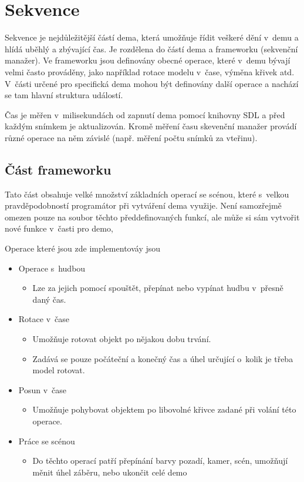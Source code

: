 \chapter{Sekvence} \label{sekvence}
Sekvence je nejdůležitější částí dema, která umožňuje řídit veškeré dění v~demu a hlídá uběhlý a zbývající čas.
Je rozdělena do částí dema a frameworku (sekvenční manažer).
Ve frameworku jsou definovány obecné operace, které v~demu bývají velmi často prováděny, jako například rotace modelu v~čase, výměna křivek atd. 
V~části určené pro specifická dema mohou být definovány další operace a nachází se tam hlavní struktura událostí.

Čas je měřen v~milisekundách od zapnutí dema pomocí knihovny SDL a před každým snímkem je aktualizován.
Kromě měření času skevenční manažer provádí různé operace na něm závislé (např. měření počtu snímků za vteřinu).

\section{Část frameworku}
Tato část obsahuje velké množství základních operací se scénou, které s~velkou pravděpodobností programátor při vytváření dema využije.
Není samozřejmě omezen pouze na soubor těchto předdefinovaných funkcí, ale může si sám vytvořit nové funkce v~časti pro demo,

Operace které jsou zde implementováy jsou 
\begin{itemize}
  \item Operace s~hudbou
    \begin{itemize}
     \item Lze za jejich pomocí spouštět, přepínat nebo vypínat hudbu v~přesně daný čas.
    \end{itemize}
  \item Rotace v~čase
    \begin{itemize}
     \item Umožňuje rotovat objekt po nějakou dobu trvání.
     \item Zadává se pouze počáteční a konečný čas a úhel určující o~kolik je třeba model rotovat. 
    \end{itemize}
  \item Posun v~čase
    \begin{itemize}
     \item Umožňuje pohybovat objektem po libovolné křivce zadané při volání této operace. 
    \end{itemize}
  \item Práce se scénou
    \begin{itemize}
     \item Do těchto operací patří přepínání barvy pozadí, kamer, scén, umožňují měnit úhel záběru, nebo ukončit celé demo
    \end{itemize}
\end{itemize}

